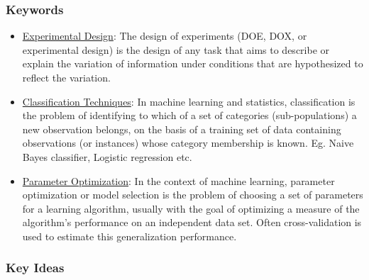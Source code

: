\documentclass[conference]{IEEEtran}
\begin{document}
\subsubsection{\textbf{Keywords}}
\begin{itemize}
    \item \underline{Experimental Design}: The design of experiments (DOE, DOX, or experimental design) is the design of any task that aims to describe or explain the variation of information under conditions that are hypothesized to reflect the variation.
    \item \underline{Classification Techniques}: In machine learning and statistics, classification is the problem of identifying to which of a set of categories (sub-populations) a new observation belongs, on the basis of a training set of data containing observations (or instances) whose category membership is known. Eg. Naive Bayes classifier, Logistic regression etc.
    \item \underline{Parameter Optimization}: In the context of machine learning, parameter optimization or model selection is the problem of choosing a set of parameters for a learning algorithm, usually with the goal of optimizing a measure of the algorithm's performance on an independent data set. Often cross-validation is used to estimate this generalization performance.
\end{itemize}

\subsubsection{\textbf{Key Ideas}}
\end{document}
